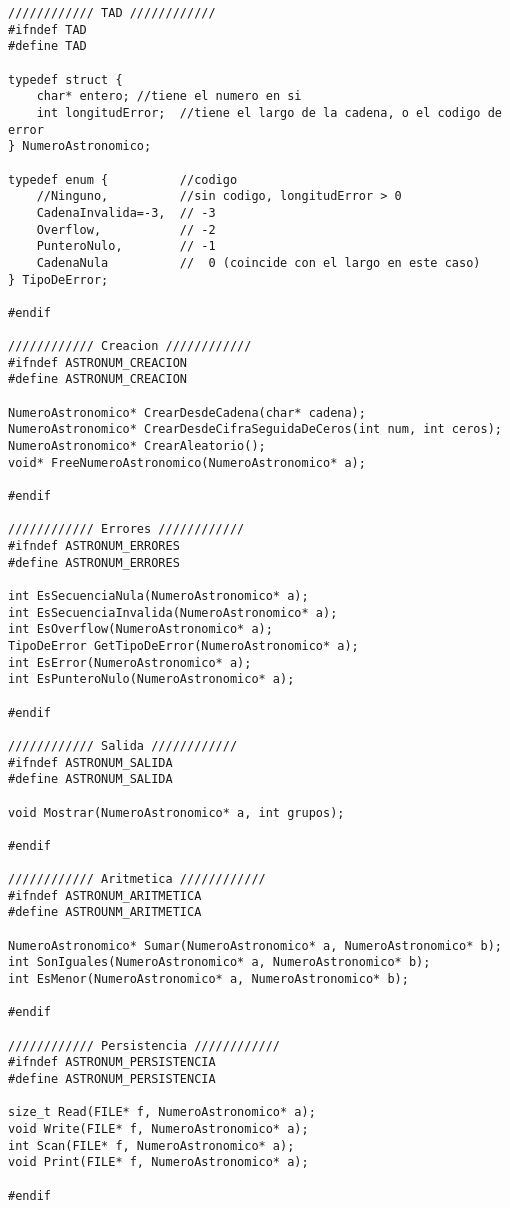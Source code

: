 \documentclass[a4paper, 12pt]{article}
\begin{document}
\begin{lstlisting}[style=C]
//////////// TAD ////////////
#ifndef TAD
#define TAD

typedef struct {
    char* entero; //tiene el numero en si
    int longitudError;  //tiene el largo de la cadena, o el codigo de error
} NumeroAstronomico;

typedef enum {          //codigo
    //Ninguno,          //sin codigo, longitudError > 0
    CadenaInvalida=-3,  // -3
    Overflow,           // -2
    PunteroNulo,        // -1
    CadenaNula          //  0 (coincide con el largo en este caso)
} TipoDeError;

#endif

//////////// Creacion ////////////
#ifndef ASTRONUM_CREACION
#define ASTRONUM_CREACION

NumeroAstronomico* CrearDesdeCadena(char* cadena);
NumeroAstronomico* CrearDesdeCifraSeguidaDeCeros(int num, int ceros);
NumeroAstronomico* CrearAleatorio();
void* FreeNumeroAstronomico(NumeroAstronomico* a);

#endif

//////////// Errores ////////////
#ifndef ASTRONUM_ERRORES
#define ASTRONUM_ERRORES

int EsSecuenciaNula(NumeroAstronomico* a);
int EsSecuenciaInvalida(NumeroAstronomico* a);
int EsOverflow(NumeroAstronomico* a);
TipoDeError GetTipoDeError(NumeroAstronomico* a);
int EsError(NumeroAstronomico* a);
int EsPunteroNulo(NumeroAstronomico* a);

#endif

//////////// Salida ////////////
#ifndef ASTRONUM_SALIDA
#define ASTRONUM_SALIDA

void Mostrar(NumeroAstronomico* a, int grupos);

#endif

//////////// Aritmetica ////////////
#ifndef ASTRONUM_ARITMETICA
#define ASTROUNM_ARITMETICA

NumeroAstronomico* Sumar(NumeroAstronomico* a, NumeroAstronomico* b);
int SonIguales(NumeroAstronomico* a, NumeroAstronomico* b);
int EsMenor(NumeroAstronomico* a, NumeroAstronomico* b);

#endif

//////////// Persistencia ////////////
#ifndef ASTRONUM_PERSISTENCIA
#define ASTRONUM_PERSISTENCIA

size_t Read(FILE* f, NumeroAstronomico* a);
void Write(FILE* f, NumeroAstronomico* a);
int Scan(FILE* f, NumeroAstronomico* a);
void Print(FILE* f, NumeroAstronomico* a);

#endif
\end{lstlisting}
\end{document}
